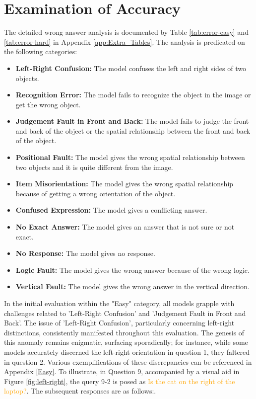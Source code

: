 \documentclass[twocolumn,11pt]{report}
\begin{document}
\section{Examination of Accuracy}\label{chap:accuracy}
The detailed wrong answer analysis is documented by Table \ref{tab:error-easy} and \ref{tab:error-hard} in Appendix \ref{app:Extra_Tables}. The analysis is predicated on the following categories:
\begin{itemize}
    \item \textbf{Left-Right Confusion:} The model confuses the left and right sides of two objects.
    \item \textbf{Recognition Error:} The model fails to recognize the object in the image or get the wrong object.
    \item \textbf{Judgement Fault in Front and Back:} The model fails to judge the front and back of the object or the spatial relationship between the front and back of the object.
    \item \textbf{Positional Fault:} The model gives the wrong spatial relationship between two objects and it is quite different from the image.
    \item \textbf{Item Misorientation:} The model gives the wrong spatial relationship because of getting a wrong orientation of the object.
    \item \textbf{Confused Expression:} The model gives a conflicting answer.
    \item \textbf{No Exact Answer:} The model gives an answer that is not sure or not exact.
    \item \textbf{No Response:} The model gives no response.
    \item \textbf{Logic Fault:} The model gives the wrong answer because of the wrong logic.
    \item \textbf{Vertical Fault:} The model gives the wrong answer in the vertical direction.
\end{itemize}

In the initial evaluation within the "Easy" category, all models grapple with challenges related to 'Left-Right Confusion' and 'Judgement Fault in Front and Back'. The issue of 'Left-Right Confusion', particularly concerning left-right distinctions, consistently manifested throughout this evaluation. The genesis of this anomaly remains enigmatic, surfacing sporadically; for instance, while some models accurately discerned the left-right orientation in question 1, they faltered in question 2. Various exemplifications of these discrepancies can be referenced in Appendix \ref{Easy}. To illustrate, in Question 9, accompanied by a visual aid in Figure \ref{fig:left-right}, the query 9-2 is posed as \textcolor{orange}{Is the cat on the right of the laptop?}. The subsequent responses are as follows:.
\end{document}

